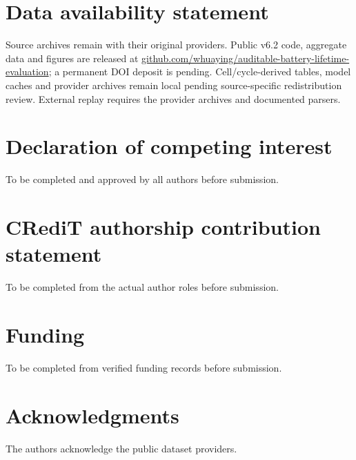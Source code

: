 \documentclass[preprint,12pt]{elsarticle}
\begin{document}
\section*{Data availability statement}
Source archives remain with their original providers. Public v6.2 code, aggregate data and figures are released at \href{https://github.com/whuaying/auditable-battery-lifetime-evaluation}{github.com/whuaying/auditable-battery-lifetime-evaluation}; a permanent DOI deposit is pending. Cell/cycle-derived tables, model caches and provider archives remain local pending source-specific redistribution review. External replay requires the provider archives and documented parsers.
\section*{Declaration of competing interest}
To be completed and approved by all authors before submission.
\section*{CRediT authorship contribution statement}
To be completed from the actual author roles before submission.
\section*{Funding}
To be completed from verified funding records before submission.
\section*{Acknowledgments}
The authors acknowledge the public dataset providers.
\end{document}
